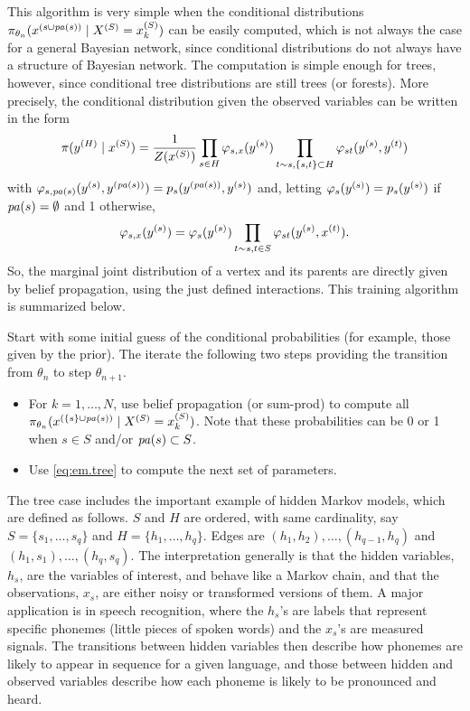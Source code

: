 This algorithm is very simple when the conditional distributions
$\pi_{\theta_n}(x^{(s\cup {\mathit{pa}(s)})}\mid  X^{(S)} = x_k^{(S)})$ can be easily
computed, which is not always the case for a
general Bayesian network, since  conditional distributions do not
always have a structure of Bayesian network. The computation is simple
enough for trees, however, since conditional tree distributions are
still trees (or forests). More
precisely, the conditional distribution given the observed variables
can be written in the form
$$
\pi(y^{(H)}\mid x^{(S)}) = \frac{1}{Z(x^{(S)})} \prod_{s\in H} \varphi_{s,x}(y^{(s)})
\prod_{t\sim s, \{s,t\} \subset H} \varphi_{st}(y^{(s)}, y^{(t)})
$$
with  $\varphi_{s,{\mathit{pa}(s)}}(y^{(s)}, y^{({\mathit{pa}(s)})}) = p_s(y^{({\mathit{pa}(s)})}, y^{(s)})$ and, letting
$\varphi_s(y^{(s)}) = p_s(y^{(s)})$ if ${\mathit{pa}(s)} = \emptyset$ and 1 otherwise,
$$
\varphi_{s,x}(y^{(s)}) =\varphi_s(y^{(s)}) \prod_{t\sim s, t\in S}
\varphi_{st}(y^{(s)}, x^{(t)}).
$$
So, the marginal joint distribution of a vertex
and its parents are directly given by  belief propagation, using the
just defined interactions. This training algorithm is summarized below.

\begin{algorithm}
Start with some initial
guess of the conditional probabilities (for example, those given by
the prior). The iterate the following two steps providing the transition from  $\theta_n$ to step $\theta_{n+1}$.

\begin{itemize}
\item[(1)] For $k=1, \ldots, N$, use belief propagation (or sum-prod) to compute 
all $\pi_{\theta_n}(x^{(\{s\}\cup {\mathit{pa}(s)})}\mid  X^{(S)} = x_k^{(S)})$. Note that these
probabilities can be 0 or 1 when $s\in S$ and/or ${\mathit{pa}(s)}\subset S$.
\item[(2)] Use \cref{eq:em.tree} to compute the next set of
parameters.
\end{itemize}
\end{algorithm}


The tree case includes the important example of hidden Markov models,
which are defined as follows. $S$ and $H$ are ordered, with same
cardinality, say $S=\{s_1, \ldots, s_q\}$ and $H=\{h_1, \ldots,
h_q\}$. Edges are $(h_1,h_2), \ldots, (h_{q-1}, h_q)$ and $(h_1,s_1),
\ldots, (h_q, s_q)$. The interpretation generally is that the hidden
variables, $h_s$, are the variables of interest, and behave like a
Markov chain, and that the observations, $x_s$, are either noisy or
transformed versions of them. A major application is in speech
recognition, where the $h_s$'s are labels that represent specific
phonemes (little pieces of spoken words) and the $x_s$'s are measured
signals. The transitions between hidden variables then describe how phonemes are likely
to appear in sequence for a given language, and those between hidden and observed variables
describe how each phoneme is likely to be pronounced and heard.

